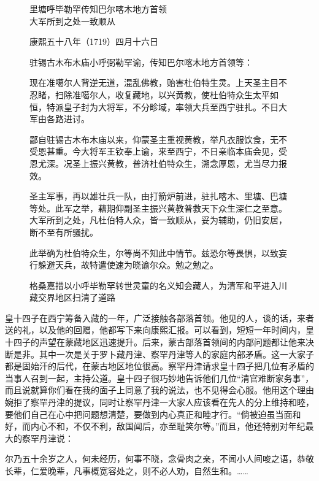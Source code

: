 \begin{figure}[p]
\begin{minipage}{\linewidth}
\begin{bookquote}
\noindent 里塘呼毕勒罕传知巴尔喀木地方首领\\
大军所到之处一致顺从

康熙五十八年（1719）四月十六日

驻锡古木布木庙小呼弼勒罕谕，传知巴尔喀木地方首领等：

现在准噶尔人背逆无道，混乱佛教，贻害杜伯特生灵。上天圣主目不忍睹，扫除准噶尔人，收复藏地，以兴黄教，使杜伯特众生太平如恒，特派皇子封为大将军，不分畛域，率领大兵至西宁驻扎。不日大军由各路进讨。

鄙自驻锡古木布木庙以来，仰蒙圣主重视黄教，举凡衣服饮食，无不受恩甚重。今大将军王钦奉上谕，来至西宁，不日亲临本庙会见，受恩尤深。况圣上振兴黄教，普济杜伯特众生，溯念厚恩，尤当尽力报效。

圣主军事，再以雄壮兵一队，由打箭炉前进，驻扎喀木、里塘、巴塘等处。此军之举，藉期仰副圣主振兴黄教普救天下众生深仁之至意。大军所到之处，凡杜伯特人众，皆一致顺从，妥为辅助，仍旧安居，断不至有所骚扰。

此举确为杜伯特众生，尔等尚不知此中情节。兹恐尔等畏惧，以致妄行躲避天兵，故特遣使速为晓谕尔众。勉之勉之。
\end{bookquote}
\end{minipage}
\caption{格桑嘉措以小呼毕勒罕转世灵童的名义知会藏人，为清军和平进入川藏交界地区扫清了道路}\label{fig:335}
\end{figure}




皇十四子在西宁筹备入藏的一年，广泛接触各部落首领。他见的人，谈的话，来者送的礼，以及他的回赠，他都写下来向康熙汇报。可以看到，短短一年时间内，皇十四子的声望在蒙藏地区迅速提升。后来，蒙古部落首领间的内部问题都让他来决断是非。其中一次是关于罗卜藏丹津、察罕丹津等人的家庭内部矛盾。这一大家子都是固始汗的后代，在蒙古地区地位很高。察罕丹津请求皇十四子把几位有矛盾的当事人召到一起，主持公道。皇十四子很巧妙地告诉他们几位“清官难断家务事”，而且说就算你们看在我的面子上同意了我的说法，也不见得会心服。他用这个理由婉拒了察罕丹津的提议，同时让察罕丹津一大家人应该看在先人的分上维持和睦，要他们自己在心中把问题想清楚，要做到内心真正和睦才行。“倘被迫虽当面和好，而内心不和，不仅不利，敌国闻后，亦至耻笑尔等。”而且，他还特别对年纪最大的察罕丹津说：



\begin{bookquote}尔乃五十余岁之人，何未经历，何事不晓，念骨肉之亲，不闻小人间唆之语，恭敬长辈，仁爱晚辈，凡事概宽容处之，则不必人劝，自然生和。……\end{bookquote}


